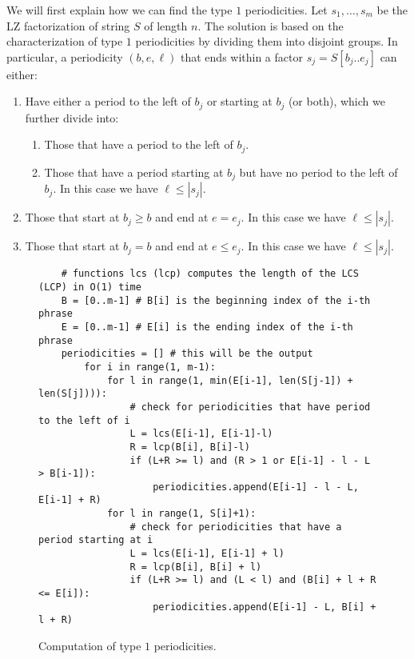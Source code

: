 We will first explain how we can find the type $1$ periodicities.
Let $s_1, \ldots, s_m$ be the LZ factorization of string $S$ of length $n$.
The solution is based on the characterization of type $1$ periodicities by dividing them into disjoint groups.
In particular, a periodicity $(b,e,\ell)$ that ends within a factor $s_j = S[b_j..e_j]$ can either:
\begin{enumerate}
    \item Have either a period to the left of $b_j$ or starting at $b_j$ (or both), which we further divide into:
    \begin{enumerate}
        \item Those that have a period to the left of $b_j$.
        \item Those that have a period starting at $b_j$ but have no period to the left of $b_j$. In this case we have $\ell \leq |s_j|$.
    \end{enumerate}
    \item Those that start at $b_j \geq b$ and end at $e = e_j$. In this case we have $\ell \leq |s_j|$.
    \item Those that start at $b_j = b$ and end at $e \leq e_j$. In this case we have $\ell \leq |s_j|$.
\end{enumerate}

\begin{figure}[!ht]
    \centering
    \begin{verbatim}
    # functions lcs (lcp) computes the length of the LCS (LCP) in O(1) time
    B = [0..m-1] # B[i] is the beginning index of the i-th phrase
    E = [0..m-1] # E[i] is the ending index of the i-th phrase
    periodicities = [] # this will be the output
        for i in range(1, m-1):
            for l in range(1, min(E[i-1], len(S[j-1]) + len(S[j]))):
                # check for periodicities that have period to the left of i
                L = lcs(E[i-1], E[i-1]-l)
                R = lcp(B[i], B[i]-l)
                if (L+R >= l) and (R > 1 or E[i-1] - l - L > B[i-1]):
                    periodicities.append(E[i-1] - l - L, E[i-1] + R)
            for l in range(1, S[i]+1):
                # check for periodicities that have a period starting at i
                L = lcs(E[i-1], E[i-1] + l)
                R = lcp(B[i], B[i] + l)
                if (L+R >= l) and (L < l) and (B[i] + l + R <= E[i]):
                    periodicities.append(E[i-1] - L, B[i] + l + R)
    \end{verbatim}
    \caption{Computation of type $1$ periodicities.}
    \label{falg:type1periods}
\end{figure}

